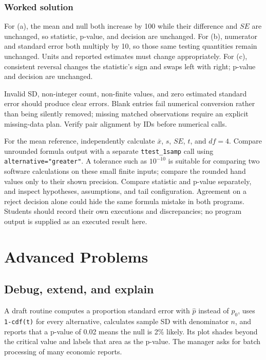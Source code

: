 \subsubsection*{Worked solution}\label{sol:validation}
For (a), the mean and null both increase by 100 while their difference and $SE$ are unchanged, so statistic, p-value, and decision are unchanged. For (b), numerator and standard error both multiply by 10, so those same testing quantities remain unchanged. Units and reported estimates must change appropriately. For (c), consistent reversal changes the statistic's sign and swaps left with right; p-value and decision are unchanged.

Invalid SD, non-integer count, non-finite values, and zero estimated standard error should produce clear errors. Blank entries fail numerical conversion rather than being silently removed; missing matched observations require an explicit missing-data plan. Verify pair alignment by IDs before numerical calls.

For the mean reference, independently calculate $\bar x$, $s$, $SE$, $t$, and $df=4$. Compare unrounded formula output with a separate \texttt{ttest\_1samp} call using \texttt{alternative="greater"}. A tolerance such as $10^{-10}$ is suitable for comparing two software calculations on these small finite inputs; compare the rounded hand values only to their shown precision. Compare statistic and p-value separately, and inspect hypotheses, assumptions, and tail configuration. Agreement on a reject decision alone could hide the same formula mistake in both programs. Students should record their own executions and discrepancies; no program output is supplied as an executed result here.
\section{Advanced Problems}\label{sec:advanced}
\subsection{Debug, extend, and explain}\label{prob:debug}
A draft routine computes a proportion standard error with $\hat p$ instead of $p_0$, uses \texttt{1-cdf(t)} for every alternative, calculates sample SD with denominator $n$, and reports that a p-value of 0.02 means the null is 2\% likely. Its plot shades beyond the critical value and labels that area as the p-value. The manager asks for batch processing of many economic reports.
